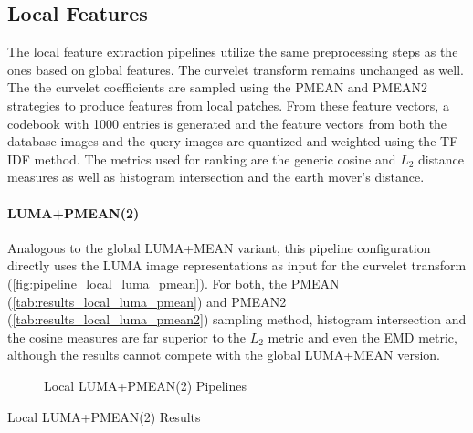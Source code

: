\subsection{Local Features}

The local feature extraction pipelines utilize the same preprocessing steps as
the ones based on global features. The curvelet transform remains unchanged as
well. The the curvelet coefficients are sampled using the PMEAN and PMEAN2
strategies to produce features from local patches. From these feature vectors,
a codebook with 1000 entries is generated and the feature vectors from both the
database images and the query images are quantized and weighted using the
TF-IDF method. The metrics used for ranking are the generic cosine and $L_2$
distance measures as well as histogram intersection and the earth mover's
distance.

\paragraph{LUMA+PMEAN(2)}

Analogous to the global LUMA+MEAN variant, this pipeline configuration directly
uses the LUMA image representations as input for the curvelet transform
(\autoref{fig:pipeline_local_luma_pmean}). For both, the PMEAN
(\autoref{tab:results_local_luma_pmean}) and PMEAN2
(\autoref{tab:results_local_luma_pmean2}) sampling method, histogram
intersection and the cosine measures are far superior to the $L_2$ metric and
even the EMD metric, although the results cannot compete with the global
LUMA+MEAN version.

\begin{figure}[h]
    \centering
    
    \caption[Local LUMA+PMEAN(2) Pipelines]{
        Local LUMA+PMEAN(2) Pipelines
    }
    \label{fig:pipeline_local_luma_pmean}
\end{figure}

\begin{table}[h]
    \centering
    \quad
    \caption[Local LUMA+PMEAN(2) Results]{
        Local LUMA+PMEAN(2) Results
    }
    \label{tab:results_local_luma_pmean_all}
\end{table}

